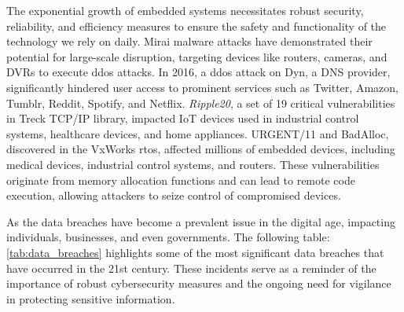 The exponential growth of embedded systems necessitates robust security,
reliability, and efficiency measures to ensure the safety and functionality of
the technology we rely on daily\cite{muench2018you}. Mirai malware attacks have
demonstrated their potential for large-scale disruption, targeting devices like
routers, cameras, and DVRs to execute \gls{ddos} attacks\cite{KrebsOnS42:online}\cite{antonakakis2017understanding}.
In 2016, a \acrshort{ddos} attack on Dyn\cite{LargeDDo94:online}, a DNS provider, significantly
hindered user access to prominent services such as Twitter, Amazon, Tumblr, Reddit, Spotify, and
Netflix\cite{muench2018you}\cite{lindqvist2017future}. \textit{Ripple20},
a set of 19 critical vulnerabilities in Treck TCP/IP library\cite{TreckTCP63:online},
impacted IoT devices used in industrial control systems, healthcare devices,
and home appliances. URGENT/11\cite{WhatisUR60:online} and BadAlloc\cite{IoTriddl27:online},
discovered in the VxWorks \gls{rtos}\cite{VxWorksI53:online},
affected millions of embedded devices, including medical devices, industrial control systems,
and routers\cite{seri2019critical}. These vulnerabilities originate from memory
allocation functions and can lead to remote code execution, allowing attackers
to seize control of compromised devices\cite{1NewMess42:online}.

As the data breaches have become a prevalent issue in the digital age,
impacting individuals, businesses, and even governments\cite{10oftheB31:online}.
The following table:\ref{tab:data_breaches} highlights some of the most
significant data breaches that have occurred in
the 21st century\cite{The15big77:online}\cite{10oftheB31:online}.
These incidents serve as a reminder of the importance of robust
cybersecurity measures and the ongoing need for vigilance in
protecting sensitive information.

